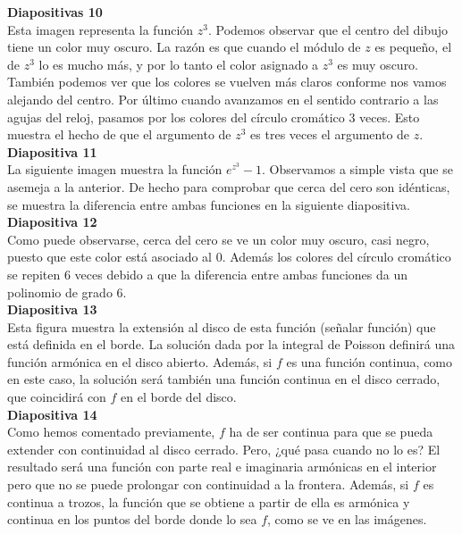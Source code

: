 \documentclass[spanish, a4paper, 12pt]{article}
\begin{document}
\textbf{Diapositivas 10} \\

Esta imagen representa la función $z^3$. Podemos observar que el centro del dibujo tiene un color muy oscuro. La razón es que cuando el módulo de $z$ es pequeño, el de $z^3$ lo es mucho más, y por lo tanto el color asignado a $z^3$ es muy oscuro. También podemos ver que los colores se vuelven más claros conforme nos vamos alejando del centro. Por último cuando avanzamos en el sentido contrario a las agujas del reloj, pasamos por los colores del círculo cromático $3$ veces. Esto muestra el hecho de que el argumento de $z^3$ es tres veces el argumento de $z$. \\

\textbf{Diapositiva 11} \\

La siguiente imagen muestra la función $e^{z^3}-1$. Observamos a simple vista que se asemeja a la anterior. De hecho para comprobar que cerca del cero son idénticas, se muestra la diferencia entre ambas funciones en la siguiente diapositiva. \\

\textbf{Diapositiva 12} \\

Como puede observarse, cerca del cero se ve un color muy oscuro, casi negro, puesto que este color está asociado al $0$. Además los colores del círculo cromático se repiten $6$ veces debido a que la diferencia entre ambas funciones da un polinomio de grado $6$. \\

\textbf{Diapositiva 13} \\

Esta figura muestra la extensión al disco de esta función (señalar función) que está definida en el borde. La solución dada por la integral de Poisson definirá una función armónica en el disco abierto. Además, si $f$ es una función continua, como en este caso, la solución será también una función continua en el disco cerrado, que coincidirá con $f$ en el borde del disco. \\

\textbf{Diapositiva 14} \\

Como hemos comentado previamente, $f$ ha de ser continua para que se pueda extender con continuidad al disco cerrado. Pero, ¿qué pasa cuando no lo es? El resultado será una función con parte real e imaginaria armónicas en el interior pero que no se puede prolongar con continuidad a la frontera. Además, si $f$ es continua a trozos, la función que se obtiene a partir de ella es armónica y continua en los puntos del borde donde lo sea $f$, como se ve en las imágenes. \\
\end{document}
